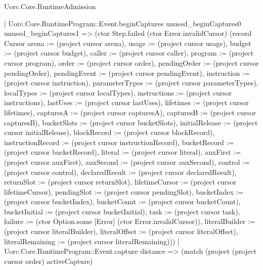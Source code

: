 \begin{lexlean}{Uorc.Core.RuntimeAdmission}
\begin{semanticmodule}
{          | Uorc.Core.RuntimeProgram::Event.beginCaptures unused_beginCaptures0 unused_beginCaptures1 => (ctor Step.failed (ctor Error.invalidCursor) (record Cursor {arena := (project cursor arena), usage := (project cursor usage), budget := (project cursor budget), caller := (project cursor caller), program := (project cursor program), order := (project cursor order), pendingOrder := (project cursor pendingOrder), pendingEvent := (project cursor pendingEvent), instruction := (project cursor instruction), parameterTypes := (project cursor parameterTypes), localTypes := (project cursor localTypes), instructions := (project cursor instructions), lastUses := (project cursor lastUses), lifetimes := (project cursor lifetimes), capturesA := (project cursor capturesA), capturesB := (project cursor capturesB), bucketSlots := (project cursor bucketSlots), initialRelease := (project cursor initialRelease), blockRecord := (project cursor blockRecord), instructionRecord := (project cursor instructionRecord), bucketRecord := (project cursor bucketRecord), literal := (project cursor literal), auxFirst := (project cursor auxFirst), auxSecond := (project cursor auxSecond), control := (project cursor control), declaredResult := (project cursor declaredResult), returnSlot := (project cursor returnSlot), lifetimeCursor := (project cursor lifetimeCursor), pendingSlot := (project cursor pendingSlot), bucketIndex := (project cursor bucketIndex), bucketCount := (project cursor bucketCount), bucketInitial := (project cursor bucketInitial), task := (project cursor task), failure := (ctor Option.some [Error] (ctor Error.invalidCursor)), literalBuilder := (project cursor literalBuilder), literalOffset := (project cursor literalOffset), literalRemaining := (project cursor literalRemaining)}))
          | Uorc.Core.RuntimeProgram::Event.capture distance => (match (project (project cursor order) activeCapture)
}
\end{semanticmodule}
\end{lexlean}
